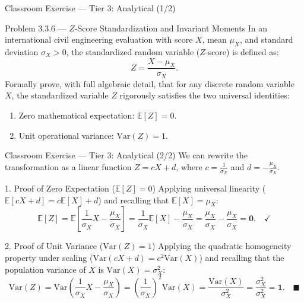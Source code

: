 \documentclass[aspectratio=169,xcolor={dvipsnames,table}]{beamer}
\begin{document}
\begin{frame}{Classroom Exercise --- Tier 3: Analytical (1/2)}
	\begin{block}{Problem 3.3.6 --- $Z$-Score Standardization and Invariant Moments}
		\footnotesize
		In an international civil engineering evaluation with score $X$, mean $\mu_X$, and standard deviation $\sigma_X > 0$, the standardized random variable ($Z$-score) is defined as:
		$$Z = \dfrac{X - \mu_X}{\sigma_X}.$$
		Formally prove, with full algebraic detail, that for any discrete random variable $X$, the standardized variable $Z$ rigorously satisfies the two universal identities:
		\begin{enumerate}\itemsep=0.15cm
			\item Zero mathematical expectation: $\mathbb{E}[Z] = 0$.
			\item Unit operational variance: $\text{Var}(Z) = 1$.
		\end{enumerate}
	\end{block}
\end{frame}

\begin{frame}{Classroom Exercise --- Tier 3: Analytical (2/2)}
	\fontsize{7.5pt}{9pt}\selectfont
	We can rewrite the transformation as a linear function $Z = cX + d$, where $c = \frac{1}{\sigma_X}$ and $d = -\frac{\mu_X}{\sigma_X}$. \pause

	\vspace{-0.05cm}
	\begin{block}{1. Proof of Zero Expectation ($\mathbb{E}[Z] = 0$)}
		\fontsize{7.5pt}{9pt}\selectfont
		Applying universal linearity ($\mathbb{E}[cX + d] = c\mathbb{E}[X] + d$) and recalling that $\mathbb{E}[X] = \mu_X$:
		$$\mathbb{E}[Z] = \mathbb{E}\left[ \dfrac{1}{\sigma_X} X - \dfrac{\mu_X}{\sigma_X} \right] = \dfrac{1}{\sigma_X}\mathbb{E}[X] - \dfrac{\mu_X}{\sigma_X} = \dfrac{\mu_X}{\sigma_X} - \dfrac{\mu_X}{\sigma_X} = \mathbf{0}. \quad \checkmark$$
	\end{block}

	\vspace{-0.1cm}
	\pause
	\begin{alertblock}{2. Proof of Unit Variance ($\text{Var}(Z) = 1$)}
		\fontsize{7.5pt}{9pt}\selectfont
		Applying the quadratic homogeneity property under scaling ($\text{Var}(cX + d) = c^2 \text{Var}(X)$) and recalling that the population variance of $X$ is $\text{Var}(X) = \sigma_X^2$:
		$$\text{Var}(Z) = \text{Var}\left( \dfrac{1}{\sigma_X} X - \dfrac{\mu_X}{\sigma_X} \right) = \left( \dfrac{1}{\sigma_X} \right)^2 \text{Var}(X) = \dfrac{\text{Var}(X)}{\sigma_X^2} = \dfrac{\sigma_X^2}{\sigma_X^2} = \mathbf{1}. \quad \blacksquare$$
	\end{alertblock}
\end{frame}
\end{document}
